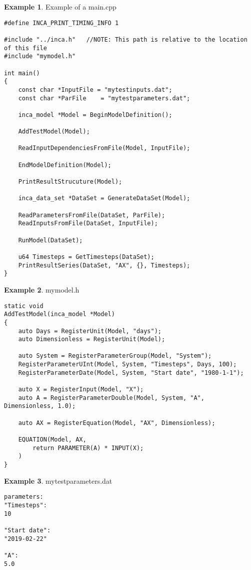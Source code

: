 \documentclass[11pt]{article}
\theoremstyle{definition}
\newtheorem{myexample}{Example}
\newenvironment{example}%
  {\begin{lrbox}{\examplebox}%
   \begin{minipage}{\dimexpr\linewidth-2\fboxsep}
   \begin{myexample}}%
  {\end{myexample}%
   \end{minipage}%
   \end{lrbox}%
   \begin{trivlist}
     \item[]\colorbox{silver}{\usebox\examplebox}
   \end{trivlist}}
\begin{document}
\begin{example}\label{ex:examplemain}
Example of a main.cpp
\begin{lstlisting}[style=mycpp]
#define INCA_PRINT_TIMING_INFO 1

#include "../inca.h"   //NOTE: This path is relative to the location of this file
#include "mymodel.h"

int main()
{
	const char *InputFile = "mytestinputs.dat";
	const char *ParFile    = "mytestparameters.dat";

	inca_model *Model = BeginModelDefinition();
	
	AddTestModel(Model);
	
	ReadInputDependenciesFromFile(Model, InputFile);

	EndModelDefinition(Model);

	PrintResultStrucuture(Model);

	inca_data_set *DataSet = GenerateDataSet(Model);

	ReadParametersFromFile(DataSet, ParFile);
	ReadInputsFromFile(DataSet, InputFile);

	RunModel(DataSet);

	u64 Timesteps = GetTimesteps(DataSet);
	PrintResultSeries(DataSet, "AX", {}, Timesteps);
}

\end{lstlisting}
\end{example}

\begin{example}
mymodel.h
\begin{lstlisting}[style=mycpp]
static void
AddTestModel(inca_model *Model)
{
	auto Days = RegisterUnit(Model, "days");
	auto Dimensionless = RegisterUnit(Model);

	auto System = RegisterParameterGroup(Model, "System");
	RegisterParameterUInt(Model, System, "Timesteps", Days, 100);
	RegisterParameterDate(Model, System, "Start date", "1980-1-1");

	auto X = RegisterInput(Model, "X");
	auto A = RegisterParameterDouble(Model, System, "A", Dimensionless, 1.0);

	auto AX = RegisterEquation(Model, "AX", Dimensionless);

	EQUATION(Model, AX,
		return PARAMETER(A) * INPUT(X);
	)
}
\end{lstlisting}
\end{example}

\begin{example}
mytestparameters.dat
\begin{lstlisting}[style=textstyle]
parameters:
"Timesteps":
10

"Start date":
"2019-02-22"

"A":
5.0
\end{lstlisting}
\end{example}
\end{document}
